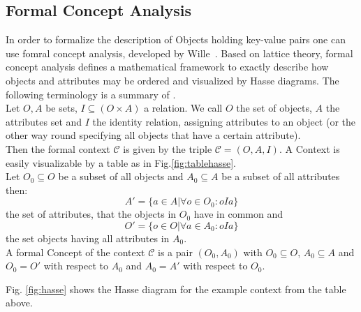 \subsection{Formal Concept Analysis}
In order to formalize the description of Objects holding key-value pairs one can use fomral concept analysis, developed by Wille~\cite{wille1982restructuring}. Based on lattice theory, formal concept analysis defines a mathematical framework to exactly describe how objects and attributes may be ordered and visualized by Hasse diagrams. The following terminology is a summary of \cite{ganter2012formal}. \\

Let $O, A$ be sets, $I \subseteq (O \times A)$ a relation. We call $O$ the set of objects, $A$ the attributes set and $I$ the identity relation, assigning attributes to an object (or the other way round specifying all objects that have a certain attribute). \\

Then the formal context $\mathcal{C}$ is given by the triple $\mathcal{C} = (O, A, I)$. A Context is easily visualizable by a table as in Fig.\ref{fig:tablehasse}.  \\

Let $O_0 \subseteq O$ be a subset of all objects and $A_0 \subseteq A$ be a subset of all attributes then:
\[ A' = \{ a \in A | \forall o \in O_0: oIa \}  \]
the set of attributes, that the objects in $O_0$ have in common and 
\[ O' = \{ o \in O | \forall a \in A_0: oIa \} \]
the set objects having all attributes in $A_0$. \\

A formal Concept of the context $\mathcal{C}$ is a pair $(O_0, A_0)$ with $O_0 \subseteq O$,  $A_0 \subseteq A$ and $O_0 = O'$ with respect to $A_0$ and $A_0 = A'$ with respect to $O_0$.



Fig. \ref{fig:hasse} shows the Hasse diagram for the example context from the table above. 



